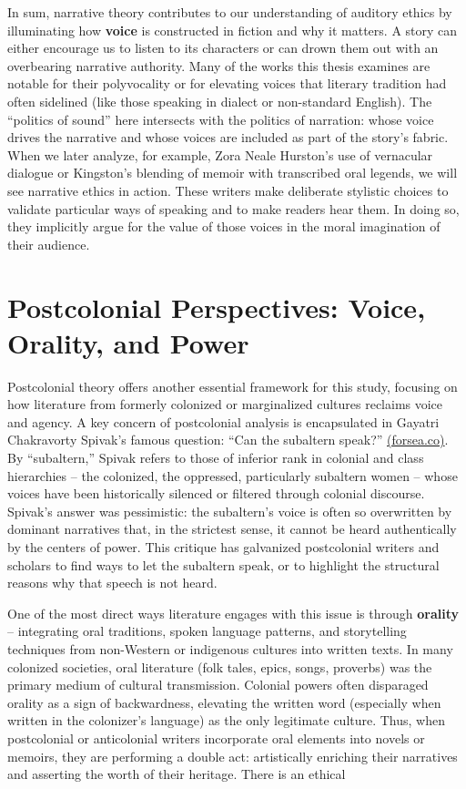\documentclass[12pt]{report}
\begin{document}
In sum, narrative theory contributes to our understanding of auditory ethics by illuminating how \textbf{voice} is constructed in fiction and why it matters. A story can either encourage us to listen to its characters or can drown them out with an overbearing narrative authority. Many of the works this thesis examines are notable for their polyvocality or for elevating voices that literary tradition had often sidelined (like those speaking in dialect or non-standard English). The “politics of sound” here intersects with the politics of narration: whose voice drives the narrative and whose voices are included as part of the story’s fabric. When we later analyze, for example, Zora Neale Hurston’s use of vernacular dialogue or Kingston’s blending of memoir with transcribed oral legends, we will see narrative ethics in action. These writers make deliberate stylistic choices to validate particular ways of speaking and to make readers hear them. In doing so, they implicitly argue for the value of those voices in the moral imagination of their audience.

\section{Postcolonial Perspectives: Voice, Orality, and Power}
Postcolonial theory offers another essential framework for this study, focusing on how literature from formerly colonized or marginalized cultures reclaims voice and agency. A key concern of postcolonial analysis is encapsulated in Gayatri Chakravorty Spivak’s famous question: “Can the subaltern speak?” \href{https://forsea.co/silent-voices-the-subaltern-can-speak-have-always-spoken/#:~:text=%E2%80%9CCan%20the%20subaltern%20speak%3F%E2%80%9D%2C%20postcolonial,and%20always%20will%20speak}{(forsea.co)}. By “subaltern,” Spivak refers to those of inferior rank in colonial and class hierarchies – the colonized, the oppressed, particularly subaltern women – whose voices have been historically silenced or filtered through colonial discourse. Spivak’s answer was pessimistic: the subaltern’s voice is often so overwritten by dominant narratives that, in the strictest sense, it cannot be heard authentically by the centers of power. This critique has galvanized postcolonial writers and scholars to find ways to let the subaltern speak, or to highlight the structural reasons why that speech is not heard.

One of the most direct ways literature engages with this issue is through \textbf{orality} – integrating oral traditions, spoken language patterns, and storytelling techniques from non-Western or indigenous cultures into written texts. In many colonized societies, oral literature (folk tales, epics, songs, proverbs) was the primary medium of cultural transmission. Colonial powers often disparaged orality as a sign of backwardness, elevating the written word (especially when written in the colonizer’s language) as the only legitimate culture. Thus, when postcolonial or anticolonial writers incorporate oral elements into novels or memoirs, they are performing a double act: artistically enriching their narratives and asserting the worth of their heritage. There is an ethical
\end{document}
